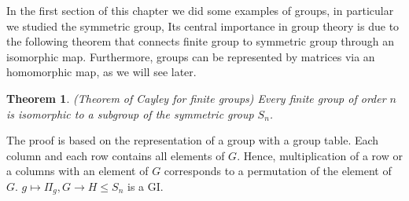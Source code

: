 \documentclass[12pt]{book}
\theoremstyle{plain}
\newtheorem{thm}{Theorem}[section]
\theoremstyle{definition}
\theoremstyle{remark}
\begin{document}
In the first section of this chapter we did some examples of groups, in particular we studied the symmetric group, Its central importance in group theory is due to the following theorem that connects finite group to symmetric group through an isomorphic map. Furthermore, groups can be represented by matrices via an homomorphic map, as we will see later.
\begin{thm}
(Theorem of Cayley for finite groups) Every finite group of order $n$ is isomorphic to a subgroup of the symmetric group $S_n$.
\end{thm}
The proof is based on the representation of a group with a group table. Each column and each row contains all elements of $G$. Hence, multiplication of a row or a columns with an element of $G$ corresponds to a permutation of the element of $G$. $g\mapsto \Pi_g, G\to H\leq S_n$ is a GI.
\end{document}
